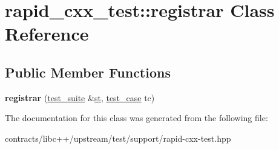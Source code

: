\hypertarget{classrapid__cxx__test_1_1registrar}{}\section{rapid\+\_\+cxx\+\_\+test\+:\+:registrar Class Reference}
\label{classrapid__cxx__test_1_1registrar}
\subsection*{Public Member Functions}
\begin{DoxyCompactItemize}
\item 
\mbox{\label{classrapid__cxx__test_1_1registrar_a609dab72dedd011a6ad90a1323b89890}} 
{\bfseries registrar} (\mbox{\hyperlink{classrapid__cxx__test_1_1test__suite}{test\+\_\+suite}} \&\mbox{\hyperlink{structst}{st}}, \mbox{\hyperlink{structrapid__cxx__test_1_1test__case}{test\+\_\+case}} tc)
\end{DoxyCompactItemize}


The documentation for this class was generated from the following file\+:\begin{DoxyCompactItemize}
\item 
contracts/libc++/upstream/test/support/rapid-\/cxx-\/test.\+hpp\end{DoxyCompactItemize}
